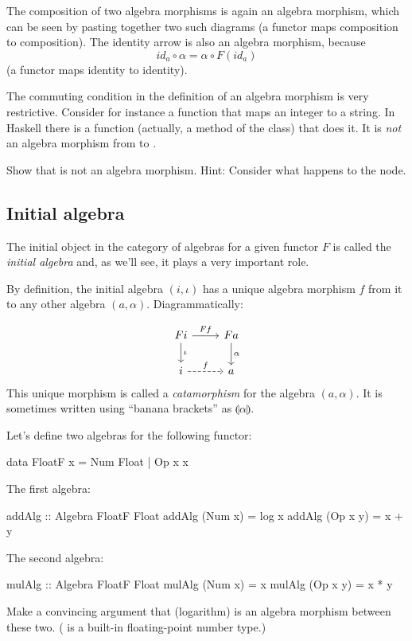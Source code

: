 \documentclass[DaoFP]{subfiles}
\begin{document}
The composition of two algebra morphisms is again an algebra morphism, which can be seen by pasting together two such diagrams (a functor maps composition to composition). The identity arrow is also an algebra morphism, because 
\[ id_a \circ \alpha = \alpha \circ F (id_a) \]
(a functor maps identity to identity).

The commuting condition in the definition of an algebra morphism is very restrictive. Consider for instance a function that maps an integer to a string. In Haskell there is a  function (actually, a method of the  class) that does it. It is \emph{not} an algebra morphism from  to . 

\begin{exercise}
Show that  is not an algebra morphism. Hint: Consider what happens to the  node.
\end{exercise}

\subsection{Initial algebra}

The initial object in the category of algebras for a given functor $F$ is called the \emph{initial algebra} and, as we'll see, it plays a very important role.

By definition, the initial algebra $(i, \iota)$ has a unique algebra morphism $f$ from it to any other algebra $(a, \alpha)$. Diagrammatically:

\[
 \begin{tikzcd}
 F i 
 \arrow[r, "F f"]
 \arrow[d, "\iota"]
 & F a
\arrow[d, "\alpha"]
 \\
 i
 \arrow[r, dashed, "f"]
 & a
  \end{tikzcd}
\]
 This unique morphism is called a \emph{catamorphism} for the algebra $(a, \alpha)$. It is sometimes written using \index{$\llparenthesis \rrparenthesis$}``banana brackets'' as $\llparenthesis \alpha \rrparenthesis$.


\begin{exercise}
Let's define two algebras for the following functor:
\begin{haskell}
data FloatF x = Num Float | Op x x
\end{haskell}
The first algebra:
\begin{haskell}
addAlg :: Algebra FloatF Float
addAlg (Num x) = log x
addAlg (Op x y) = x + y
\end{haskell}
The second algebra:
\begin{haskell}
mulAlg :: Algebra FloatF Float
mulAlg (Num x) = x
mulAlg (Op x y) = x * y
\end{haskell}
Make a convincing argument that  (logarithm) is an algebra morphism between these two. ( is a built-in floating-point number type.)
\end{exercise}
\end{document}
